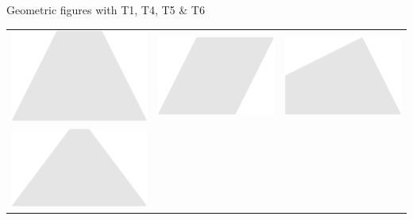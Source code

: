 \documentclass[14pt]{beamer}
\begin{document}
\begin{frame}{Geometric figures with T1, T4, T5 \& T6}
\begin{center}
\begin{tabular}{ccc}
                    \includegraphics[scale=0.3]{figures/figure023d.pdf} \;\;&
                \;\;\includegraphics[scale=0.3]{figures/figure023f.pdf} \;\;&
                \;\;\includegraphics[scale=0.3]{figures/figure023h.pdf} \\[2ex]
                    \includegraphics[scale=0.3]{figures/figure023e.pdf} \;\;&

\end{tabular}
\end{center}
\end{frame}
\end{document}
